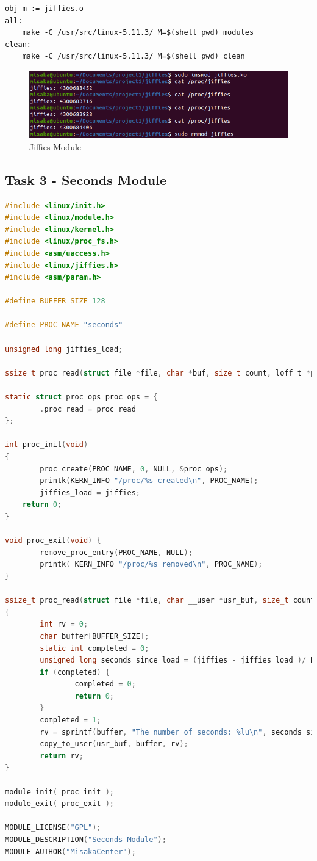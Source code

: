 \documentclass[UTF8,10pt,a4paper]{article}
\theoremstyle{Problem}
\theoremstyle{Solution}
\begin{document}
\begin{lstlisting}
obj-m := jiffies.o
all:
	make -C /usr/src/linux-5.11.3/ M=$(shell pwd) modules
clean:
	make -C /usr/src/linux-5.11.3/ M=$(shell pwd) clean
\end{lstlisting}

\begin{figure}[H]
    \centering
    \includegraphics[width=380pt]{jiff.png}
    \caption{Jiffies Module}
    \label{7223}
\end{figure}

\subsection{Task 3 - Seconds Module}


\begin{lstlisting}[language = c]
#include <linux/init.h>
#include <linux/module.h>
#include <linux/kernel.h>
#include <linux/proc_fs.h>
#include <asm/uaccess.h>
#include <linux/jiffies.h>
#include <asm/param.h>

#define BUFFER_SIZE 128

#define PROC_NAME "seconds"

unsigned long jiffies_load;

ssize_t proc_read(struct file *file, char *buf, size_t count, loff_t *pos);

static struct proc_ops proc_ops = {
        .proc_read = proc_read
};

int proc_init(void)
{
        proc_create(PROC_NAME, 0, NULL, &proc_ops);
        printk(KERN_INFO "/proc/%s created\n", PROC_NAME);
        jiffies_load = jiffies;
	return 0;
}

void proc_exit(void) {
        remove_proc_entry(PROC_NAME, NULL);
        printk( KERN_INFO "/proc/%s removed\n", PROC_NAME);
}

ssize_t proc_read(struct file *file, char __user *usr_buf, size_t count, loff_t *pos)
{
        int rv = 0;
        char buffer[BUFFER_SIZE];
        static int completed = 0;
        unsigned long seconds_since_load = (jiffies - jiffies_load )/ HZ;
        if (completed) {
                completed = 0;
                return 0;
        }
        completed = 1;
        rv = sprintf(buffer, "The number of seconds: %lu\n", seconds_since_load);
        copy_to_user(usr_buf, buffer, rv);
        return rv;
}

module_init( proc_init );
module_exit( proc_exit );

MODULE_LICENSE("GPL");
MODULE_DESCRIPTION("Seconds Module");
MODULE_AUTHOR("MisakaCenter");
\end{lstlisting}
\end{document}
